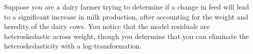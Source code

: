 \documentclass[12pt]{../notes}
\begin{document}

Suppose you are a dairy farmer trying to determine if a change in feed will lead to a significant increase in milk production, after accounting for the weight and heredity of the dairy cows. You notice that the model residuals are heteroskedastic across weight, though you determine that you can eliminate the heteroskedasticity with a log-transformation. 


\begin{minipage}[l][10cm][c]{\textwidth}
\begin{comment}
\note{Arguments for OLS:
\begin{itemize}
\item Better suited for variable inference (exact solution with unbiased, minimum variance coefficient estimates). 
\item Much easier to fit computationally. 
\item Less model output (one model as opposed to many). 
\end{itemize}
Arguments for Quantile Regression:
\begin{itemize}
\item More information rich: quantifies the differences in milk production across quantiles.  
\item Requires no variable transformation (easier to explain predictions). 
\item Outlier observations less influential.  
\end{itemize}}
\end{comment}
\end{minipage}


\begin{minipage}[l][4cm][c]{\textwidth}
\begin{comment}
\note{Outlier values are associated with large residuals. Squaring large residual values makes them especially large in the loss function. Check loss functions experience a linear increase, rather than a quadratic increase, in the penalty for outlier observations which gives outliers less influence in the optimization.} 
\end{comment}
\end{minipage}
\end{document}
